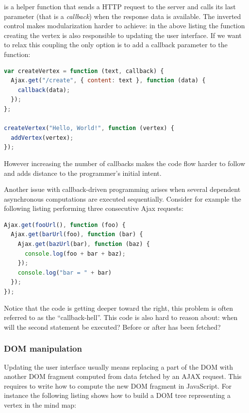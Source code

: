 \documentclass[american,english,runningheads]{llncs}
\begin{document}
 is a helper function that sends a HTTP request to the server and calls its last parameter (that is a \emph{callback}) when the response data is available. The inverted control makes modularization harder to achieve: in the above listing the function creating the vertex is also responsible to updating the user interface. If we want to relax this coupling the only option is to add a callback parameter to the  function:

\begin{lstlisting}[language=JavaScript,label=async-js,caption=Callback-driven JavaScript APIs]
var createVertex = function (text, callback) {
  Ajax.get("/create", { content: text }, function (data) {
    callback(data);
  });
};

createVertex("Hello, World!", function (vertex) {
  addVertex(vertex);
});
\end{lstlisting}

However increasing the number of callbacks makes the code flow harder to follow and adds distance to the programmer's initial intent.

Another issue with callback-driven programming arises when several dependent asynchronous computations are executed sequentially. Consider for example the following listing performing three consecutive Ajax requests:

\begin{lstlisting}[language=JavaScript,label=async-callback-hell,caption=Sequential asynchronous calls]
Ajax.get(fooUrl(), function (foo) {
  Ajax.get(barUrl(foo), function (bar) {
    Ajax.get(bazUrl(bar), function (baz) {
      console.log(foo + bar + baz);
    });
    console.log("bar = " + bar)
  });
});
\end{lstlisting}

Notice that the code is getting deeper toward the right, this problem is often referred to as the “callback-hell”. This code is also hard to reason about: when will the second  statement be executed? Before or after  has been fetched?

\subsubsection{DOM manipulation}
\label{forest}

Updating the user interface usually means replacing a part of the DOM with another DOM fragment computed from data fetched by an AJAX request. This requires to write how to compute the new DOM fragment in JavaScript. For instance the following listing shows how to build a DOM tree representing a vertex in the mind map:
\end{document}
